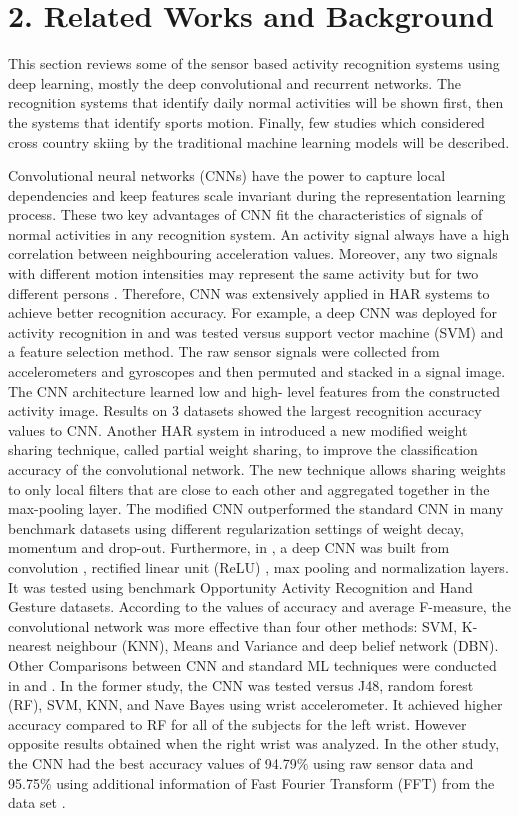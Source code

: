\documentclass[12pt,a4paper]{article}
\begin{document}
\section*{2. Related Works and Background} \label{sec:RWAB}

This section reviews some of the sensor based activity recognition systems using deep learning, mostly the deep convolutional and recurrent networks. The recognition systems that identify daily normal activities will be shown first, then the systems that identify sports motion. Finally, few studies which considered cross country skiing by the traditional machine learning models will be described.

Convolutional neural networks (CNNs) have the power to capture local dependencies and keep features scale invariant during the representation learning process. These two key advantages of CNN fit the characteristics of signals of normal activities in any recognition system. An activity signal always have a high correlation between neighbouring acceleration values. Moreover, any two signals with different motion intensities may represent the same activity but for two different persons \cite{zeng2014convolutional}. Therefore, CNN was extensively applied in HAR systems to achieve better recognition accuracy.  For example, a deep CNN was deployed for activity recognition in \cite{jiang2015human} and was tested versus support vector machine (SVM) and a feature selection method. The raw sensor signals were collected from accelerometers and gyroscopes and then permuted and stacked in a signal image. The CNN architecture learned low and high- level features from the constructed activity image. Results on 3 datasets showed the largest recognition accuracy values to CNN. Another HAR system in \cite{zeng2014convolutional} introduced a new modified weight sharing technique, called partial weight sharing, to improve the classification accuracy of the convolutional network. The new technique allows sharing weights to only local filters that are close to each other and aggregated together in the max-pooling layer. The modified CNN outperformed the standard CNN in many benchmark datasets using different regularization settings of weight decay, momentum and drop-out. Furthermore, in \cite{yang2015deep}, a deep CNN was built from  convolution , rectified linear unit (ReLU) , max pooling  and  normalization layers. It was tested using benchmark Opportunity Activity Recognition  and Hand Gesture datasets. According to the values of accuracy and average F-measure, the convolutional network was more effective than four other methods: SVM, K-nearest neighbour (KNN), Means and Variance and deep belief network (DBN).  Other Comparisons between CNN and standard ML techniques were conducted in \cite{gjoreskicomparing} and  \cite{ronao2016human}. In the former study, the CNN was tested versus J48, random forest (RF), SVM, KNN, and Nave Bayes using wrist accelerometer. It achieved higher accuracy compared to RF for all of the subjects for the left wrist. However opposite results obtained when the right wrist was analyzed. In the other study, the CNN had the best accuracy values of 94.79\% using raw sensor data and 95.75\% using additional information of Fast Fourier Transform (FFT) from the data set .
\end{document}
